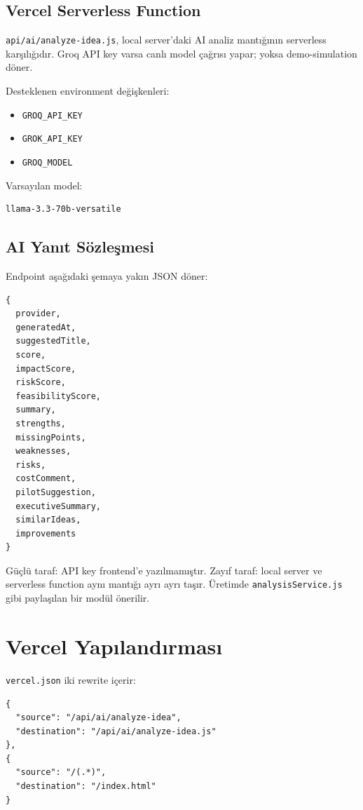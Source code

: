 \documentclass[11pt,a4paper]{article}
\newcommand{\code}[1]{\texttt{#1}}
\begin{document}
\subsection{Vercel Serverless Function}

\code{api/ai/analyze-idea.js}, local server'daki AI analiz mantığının serverless karşılığıdır. Groq API key varsa canlı model çağrısı yapar; yoksa demo-simulation döner.

Desteklenen environment değişkenleri:

\begin{itemize}
  \item \code{GROQ_API_KEY}
  \item \code{GROK_API_KEY}
  \item \code{GROQ_MODEL}
\end{itemize}

Varsayılan model:

\begin{lstlisting}
llama-3.3-70b-versatile
\end{lstlisting}

\subsection{AI Yanıt Sözleşmesi}

Endpoint aşağıdaki şemaya yakın JSON döner:

\begin{lstlisting}
{
  provider,
  generatedAt,
  suggestedTitle,
  score,
  impactScore,
  riskScore,
  feasibilityScore,
  summary,
  strengths,
  missingPoints,
  weaknesses,
  risks,
  costComment,
  pilotSuggestion,
  executiveSummary,
  similarIdeas,
  improvements
}
\end{lstlisting}

Güçlü taraf: API key frontend'e yazılmamıştır. Zayıf taraf: local server ve serverless function aynı mantığı ayrı ayrı taşır. Üretimde \code{analysisService.js} gibi paylaşılan bir modül önerilir.

\section{Vercel Yapılandırması}

\code{vercel.json} iki rewrite içerir:

\begin{lstlisting}
{
  "source": "/api/ai/analyze-idea",
  "destination": "/api/ai/analyze-idea.js"
},
{
  "source": "/(.*)",
  "destination": "/index.html"
}
\end{lstlisting}
\end{document}
